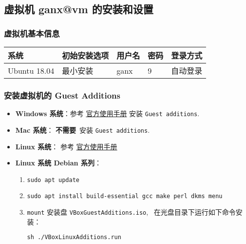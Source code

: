 \documentclass[
    11pt,
    cite=authoryear,
    device=normal,
    lang=cn,
    mode=simple,
    result=answer,
    toc=onecol,
]{elegantbook_sierxue}
\begin{document}
\subsection{虚拟机 ganx@vm 的安装和设置}%
\label{sub:vbox-vm-install-set}

\subsubsection{虚拟机基本信息}%
\label{ssub:linux-ubuntu}

\begin{table}[H]
   \centering
     \begin{tabular}{lllll}
     \toprule
     系统 & 初始安装选项 & 用户名 & 密码 & 登录方式 \\
     \midrule
     Ubuntu 18.04 & 最小安装 & ganx   & 9 & 自动登录\\
     \bottomrule
     \end{tabular}%
   \label{tab:theorem-class}%
 \end{table}%

\subsubsection{安装虚拟机的 Guest Additions}%
\label{ssub:vbox-guest-additions}
\begin{itemize}
    \item \textbf{Windows 系统}：参考
        \href{https://www.virtualbox.org/manual/UserManual.html#additions-windows}{官方使用手册}
        安装 \lstinline{Guest additions}.
    \item \textbf{Mac 系统}： \textbf{不需要}~安装
        \lstinline{Guest additions}.
    \item \textbf{Linux 系统}： 参考
        \href{https://www.virtualbox.org/manual/UserManual.html#additions-linux}{官方使用手册}
    \item \textbf{Linux 系统 Debian 系列}：
        \begin{enumerate}
            \item \lstinline{sudo apt update}
            \item \lstinline{sudo apt install build-essential gcc make perl dkms menu}
            \item \lstinline{mount} 安装盘
                \lstinline{VBoxGuestAdditions.iso},~
                在光盘目录下运行如下命令安装：
                 \begin{center}\label{}
                     \lstinline{sh ./VBoxLinuxAdditions.run}
                 \end{center}
        \end{enumerate}
\end{itemize}
\end{document}
